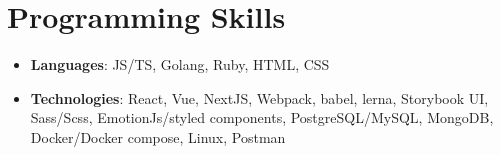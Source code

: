 \documentclass[letterpaper,11pt]{article}
\newcommand{\inDescItem}[1]{
 \item\small{
   {#1\vspace{-3pt}}
 }
}
\newcommand{\inDescListStart}{\begin{itemize}[leftmargin=*]\vspace{-3pt}}
\newcommand{\inDescListEnd}{\end{itemize}\vspace{-8pt}}
\begin{document}
%
\section{Programming Skills}
 \inDescListStart
    \inDescItem{
     \textbf{Languages}{: JS/TS, Golang, Ruby, HTML, CSS}
    }
    \inDescItem{
    \textbf{Technologies}{: React, Vue, NextJS, Webpack, babel, lerna, Storybook UI, Sass/Scss, EmotionJs/styled components, PostgreSQL/MySQL, MongoDB, Docker/Docker compose, Linux, Postman}}
 \inDescListEnd


\end{document}
